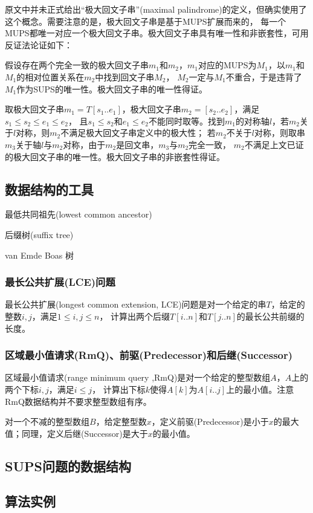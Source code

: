 原文中并未正式给出“极大回文子串”(maximal palindrome)的定义，但确实使用了这个概念。需要注意的是，极大回文子串是基于MUPS扩展而来的，
每一个MUPS都唯一对应一个极大回文子串。极大回文子串具有唯一性和非嵌套性，可用反证法论证如下：

假设存在两个完全一致的极大回文子串$m_1$和$m_2$，$m_1$对应的MUPS为$M_1$，以$m_1$和$M_1$的相对位置关系在$m_2$中找到回文子串$M_2$，
$M_2$一定与$M_1$不重合，于是违背了$M_1$作为SUPS的唯一性。极大回文子串的唯一性得证。

取极大回文子串$m_1 = T[s_1..e_1]$，极大回文子串$m_2 = [s_2..e_2]$，满足$s_1 \leq s_2 \leq e_1 \leq e_2 $，
且$s_1 \leq s_2$和$e_1 \leq e_2$不能同时取等。找到$m_1$的对称轴$l$，若$m_2$关于$l$对称，则$m_2$不满足极大回文子串定义中的极大性；
若$m_2$不关于$l$对称，则取串$m_3$关于轴$l$与$m_2$对称，由于$m_2$是回文串，$m_3$与$m_2$完全一致，
$m_2$不满足上文已证的极大回文子串的唯一性。极大回文子串的非嵌套性得证。

\subsection{数据结构的工具}\label{subsec:tools}

最低共同祖先(lowest common ancestor)

后缀树(suffix tree)

van Emde Boas 树

\subsubsection{最长公共扩展(LCE)问题}\label{subsubsec:lce}

最长公共扩展(longest common extension, LCE)问题是对一个给定的串$T$，给定的整数$i,j$，满足$1 \leq i,j \leq n$，
计算出两个后缀$T[i..n]$和$T[j..n]$的最长公共前缀的长度。

\subsubsection{区域最小值请求(RmQ)、前驱(Predecessor)和后继(Successor)}\label{subsubsec:rmq}

区域最小值请求(range minimum query ,RmQ)是对一个给定的整型数组$A$，$A$上的两个下标$i,j$，满足$i \leq j$，
计算出下标$k$使得$A[k]$为$A[i..j]$上的最小值。注意RmQ数据结构并不要求整型数组有序。

对一个不减的整型数组$B$，给定整型数$x$，定义前驱(Predecessor)是小于$x$的最大值；同理，定义后继(Successor)是大于$x$的最小值。

\subsection{SUPS问题的数据结构}\label{subsec:sups}

\subsection{算法实例}\label{subsec:eg}
